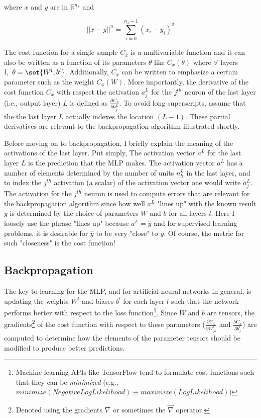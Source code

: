 \documentclass{article}
\DeclarePairedDelimiter\set\{\}
\begin{document}
where $x$ and $y$ are in $\mathbb{R}^{n_x}$ and

\begin{equation}
	||x - y||^{n} = \sum_{i=0}^{n_{x}-1} { (x_{i} - y_{i})^{2} }
\end{equation}

The cost function for a single sample $C_x$ is a multivariable function
and it can also be written as a function of its parameters $\theta$ like
$C_x(\theta)$ where $\forall$ layers $l,\ \theta = \set{W^{l}, b^{l}}$. Additionally,
$C_x$ can be written to emphasize a certain parameter such as the weight $C_x(W)$.
More importantly, the derivative of the cost function $C_x$ with respect the activation
$a_j^{L}$ for the $j^{th}$ neuron of the last layer (i.e., output layer) $L$ is defined as
$\frac{\partial C_x}{\partial a_j^{L}}$. To avoid long superscripts, assume
that the the last layer $L$ actually indexes the location $(L-1)$.
These partial derivatives are relevant to the backpropagation algorithm illustrated shortly.

Before moving on to backpropagation, I briefly explain the meaning of the activations
of the last layer. Put simply, The activation vector $a^{L}$ for the last layer $L$ is the prediction
that the MLP makes. The activation vector $a^{L}$ has a number of elements
determined by the number of units $n_h^{L}$ in the last layer, and to index the $j^{th}$
activation (a scalar) of the activation vector one would write $a_j^{L}$. The activation for
the $j^{th}$ neuron is used to compute errors that are relevant for the
backpropagation algorithm since how well $a^{L}$ "lines up" with the known
result $y$ is determined by the choice of parameters $W$ and $b$ for all layers $l$.
Here I loosely use the phrase "lines up" because $a^{L} = \hat{y}$ and for supervised
learning problems, it is desirable for $\hat{y}$ to be very "close" to $y$. Of
course, the metric for such "closeness" is the cost function!

\subsection{Backpropagation}

\quad The key to learning for the MLP, and for artificial neural networks in general,
is updating the weights $W^{l}$ and biases $b^{l}$ for each layer $l$ such
that the network performs better with respect to the loss function\footnote{
Machine learning APIs like TensorFlow tend to formulate cost functions
such that they can be \textit{minimized} (e.g.,
$minimize(NegativeLogLikelihood) \equiv maximize(LogLikelihood)$)}.
Since $W$ and $b$ are tensors, the gradients\footnote{Denoted
	using the gradients $\nabla$ or sometimes the $\vec{\nabla}$ operator.}
of the cost function with respect to these parameters ($\frac{\partial C_x}{\partial W_{jk}^{l}}$
and $\frac{\partial C_x}{\partial b_{j}^{l}}$) are computed to determine how
the elements of the parameter tensors should be modified to produce better predictions.
\end{document}
